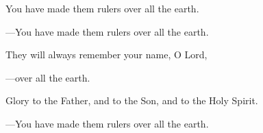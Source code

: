 \responsory

\begin{hangpar}
You have made them rulers over all the earth.

{\color{red}---\thinspace}You have made them rulers over all the earth.

\medskip They will always remember your name, O Lord,

{\color{red}---\thinspace}over all the earth.

\medskip Glory to the Father, and to the Son, and to the Holy Spirit.

{\color{red}---\thinspace}You have made them rulers over all the earth.
\end{hangpar}